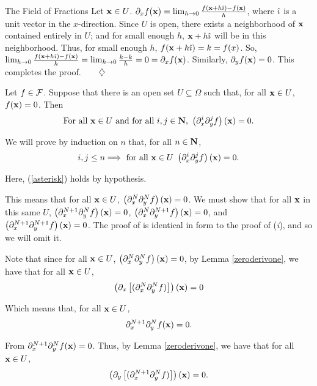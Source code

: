 \begin{section}{The Field of Fractions}
\proof
Let $\mathbf{x} \in U$.  $\partial_{x} f(\mathbf{x}) = \lim_{h \to 0} \frac{f(\mathbf{x} + h \hat{\mathbf{\imath}}) - f(\mathbf{x})}{h}$, where $\hat{\mathbf{\imath}}$ is a unit vector in the $x$-direction.  Since $U$ is open, there exists a neighborhood of $\mathbf{x}$ contained entirely in $U$; and for small enough $h$, $\mathbf{x} + h \hat{\mathbf{\imath}}$ will be in this neighborhood.  Thus, for small enough $h$, $f(\mathbf{x} + h \hat{\mathbf{\imath}}) = k = f(x)$.  So, $\lim_{h \to 0} \frac{f(\mathbf{x} + h \hat{\mathbf{\imath}}) - f(\mathbf{x})}{h} = \lim_{h \to 0} \frac{k - k}{h} = 0 = \partial_{x} f(\mathbf{x})$.  Similarly, $\partial_{y} f(\mathbf{x}) = 0$.  This completes the proof.$\qquad \diamondsuit$

\begin{lemma}
\label{zeroderiv}
Let $f \in \mathcal{F}$.  Suppose that there is an open set $U \subseteq \Omega$ such that, for all $\mathbf{x} \in U$, $f(\mathbf{x}) = 0$.  Then
\[
\mbox{For all $\mathbf{x} \in U$ and for all $i,j \in \mathbf{N}$, } \left( \partial_{x}^i \partial_{y}^j f \right)(\mathbf{x}) = 0.
\]
\end{lemma}

\proof
We will prove by induction on $n$ that, for all $n \in \mathbf{N}$,
\begin{equation}
\label{asterisk}
i, j \le n \Longrightarrow \mbox{ for all $\mathbf{x} \in U$ } \left( \partial_{x}^i \partial_{y}^j f \right)(\mathbf{x}) = 0.
\end{equation}

  Here, (\ref{asterisk}) holds by hypothesis.

 This means that for all $\mathbf{x} \in U$, $\left( \partial_{x}^N \partial_{y}^N f \right)(\mathbf{x}) = 0$.  We must show that for all $\mathbf{x}$ in this same $U$,  $\left( \partial_{x}^{N+1} \partial_{y}^N f \right) (\mathbf{x}) = 0$,  $\left( \partial_{x}^N \partial_{y}^{N+1} f \right) (\mathbf{x}) = 0$, and  $\left( \partial_{x}^{N+1} \partial_{y}^{N+1} f \right) (\mathbf{x}) = 0$.  The proof of  is identical in form to the proof of (\emph{i}), and so we will omit it.

  Note that since for all $\mathbf{x} \in U$, $\left( \partial_{x}^N \partial_{y}^N f \right) (\mathbf{x}) = 0$, by Lemma \ref{zeroderivone}, we have that for all $\mathbf{x} \in U$,
\[
\left( \partial_{x} \left[ (\partial_{x}^N \partial_{y}^N f) \right] \right) (\mathbf{x}) = 0
\]

\indent Which means that, for all $\mathbf{x} \in U$,
\[
\partial_{x}^{N+1} \partial_{y}^N f(\mathbf{x}) = 0.
\]

  From  $\partial_{x}^{N+1} \partial_{y}^N f (\mathbf{x}) = 0$.  Thus, by Lemma \ref{zeroderivone}, we have that for all $\mathbf{x} \in U$,
\[
\left( \partial_{y} \left[ (\partial_{x}^{N+1} \partial_{y}^N f) \right] \right) (\mathbf{x}) = 0.
\]


\end{section}
